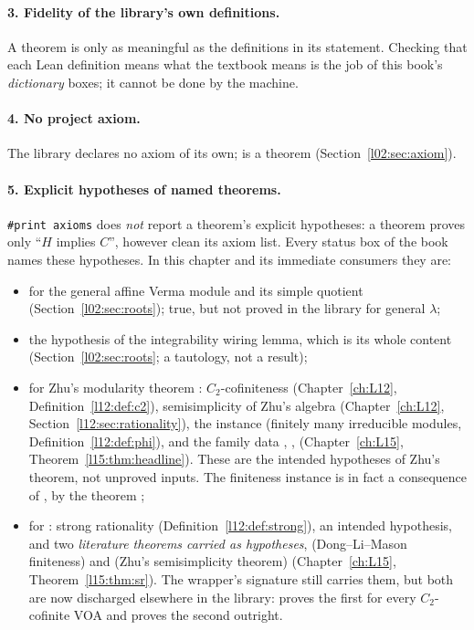 \paragraph{3. Fidelity of the library's own definitions.} A theorem is only as meaningful as the
definitions in its statement. Checking that each Lean definition means what the textbook means is the
job of this book's \emph{dictionary} boxes; it cannot be done by the machine.

\paragraph{4. No project axiom.} The library declares no axiom of its own;  is a theorem
(Section~\ref{l02:sec:axiom}).

\paragraph{5. Explicit hypotheses of named theorems.} \texttt{\#print axioms} does \emph{not} report a
theorem's explicit hypotheses: a theorem  proves only ``$H$ implies $C$'', however
clean its axiom list. Every status box of the book names these hypotheses. In this chapter and its
immediate consumers they are:
\begin{itemize}
\item {} for the general affine Verma module and its simple quotient
  (Section~\ref{l02:sec:roots}); true, but not proved in the library for general $\lambda$;
\item the hypothesis  of the integrability wiring lemma, which is its whole content
  (Section~\ref{l02:sec:roots}; a tautology, not a result);
\item for Zhu's modularity theorem \allowbreak{}\allowbreak{}\allowbreak{}\allowbreak{}:
  $C_2$-cofiniteness  (Chapter~\ref{ch:L12}, Definition~\ref{l12:def:c2}), semisimplicity of Zhu's
  algebra  (Chapter~\ref{ch:L12}, Section~\ref{l12:sec:rationality}), the instance
  \lean{[Finite (Φ W)]} (finitely many irreducible modules, Definition~\ref{l12:def:phi}), and the family data
  , ,  (Chapter~\ref{ch:L15}, Theorem~\ref{l15:thm:headline}). These are
  the intended hypotheses of Zhu's theorem, not unproved inputs. The finiteness instance is in fact a
  consequence of , by the theorem \allowbreak{};
\item for \allowbreak{}\allowbreak{}\allowbreak{}: strong rationality 
  (Definition~\ref{l12:def:strong}), an intended hypothesis, and two \emph{literature theorems carried as
  hypotheses},  (Dong--Li--Mason finiteness) and  (Zhu's semisimplicity theorem)
  (Chapter~\ref{ch:L15}, Theorem~\ref{l15:thm:sr}). The wrapper's signature still carries them, but both are
  now discharged elsewhere in the library:  proves the
  first for every $C_2$-cofinite VOA and  proves the second outright.
\end{itemize}
